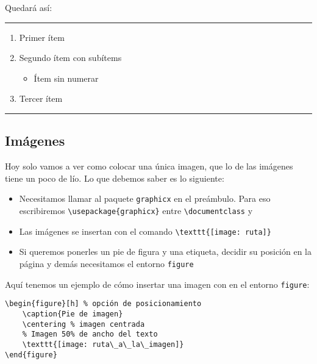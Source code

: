 Quedará así:

\begin{center}\rule{0.5\linewidth}{\linethickness}\end{center}

\begin{enumerate}
\item
  Primer ítem
\item
  Segundo ítem con subítems

  \begin{itemize}
  \item
    Ítem sin numerar
  \end{itemize}
\item
  Tercer ítem
\end{enumerate}

\begin{center}\rule{0.5\linewidth}{\linethickness}\end{center}

\subsection{Imágenes}\label{imuxe1genes}

Hoy solo vamos a ver como colocar una única imagen, que lo de las
imágenes tiene un poco de lío. Lo que debemos saber es lo siguiente:

\begin{itemize}
\item
  Necesitamos llamar al paquete \lstinline!graphicx! en el preámbulo.
  Para eso escribiremos \lstinline!\usepackage{graphicx}! entre
  \lstinline!\documentclass! y \lstinline!!
\item
  Las imágenes se insertan con el comando
  \lstinline!\texttt{[image: ruta]}!
\item
  Si queremos ponerles un pie de figura y una etiqueta, decidir su
  posición en la página y demás necesitamos el entorno
  \lstinline!figure!
\end{itemize}

Aquí tenemos un ejemplo de cómo insertar una imagen con en el entorno
\lstinline!figure!:

\begin{lstlisting}
\begin{figure}[h] % opción de posicionamiento
    \caption{Pie de imagen}
    \centering % imagen centrada
    % Imagen 50% de ancho del texto
    \texttt{[image: ruta\_a\_la\_imagen]}
\end{figure}
\end{lstlisting}


